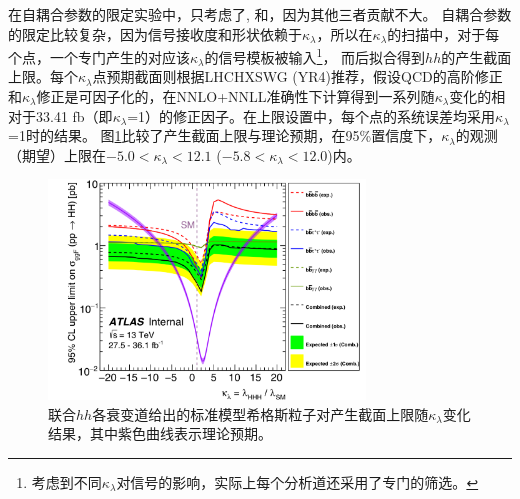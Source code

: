 在自耦合参数的限定实验中，只考虑了\bbbb , \bbtt 和\bbaa ，因为其他三者贡献不大。
自耦合参数的限定比较复杂，因为信号接收度和形状依赖于$\kappa_{\lambda}$，所以在$\kappa_{\lambda}$的扫描中，对于每个点，一个专门产生的对应该$\kappa_{\lambda}$的信号模板被输入\footnote{考虑到不同$\kappa_{\lambda}$对信号的影响，实际上每个分析道还采用了专门的筛选。}，
而后拟合得到$hh$的产生截面上限。每个$\kappa_{\lambda}$点预期截面则根据LHCHXSWG (YR4)\cite{SM-HIGGS-BR}推荐，假设QCD的高阶修正和$\kappa_{\lambda}$修正是可因子化的，在NNLO+NNLL准确性下计算得到一系列随$\kappa_{\lambda}$变化的相对于33.41 fb（即$\kappa_{\lambda}$=1）的修正因子。在上限设置中，每个点的系统误差均采用$\kappa_{\lambda}$=1时的结果。
图\ref{fig:HH_selfcoupling}比较了产生截面上限与理论预期，在95\%置信度下，$\kappa_{\lambda}$的观测（期望）上限在$-5.0<\kappa_{\lambda}<12.1$ ($-5.8<\kappa_{\lambda}<12.0$)内。
\begin{figure}[h]
\centering
 \includegraphics[width=0.75\textwidth]{fig/HH_selfcoupling.png}
 \caption{联合$hh$各衰变道给出的标准模型希格斯粒子对产生截面上限随$\kappa_{\lambda}$变化结果，其中紫色曲线表示理论预期。}
 \label{fig:HH_selfcoupling}
\end{figure}
